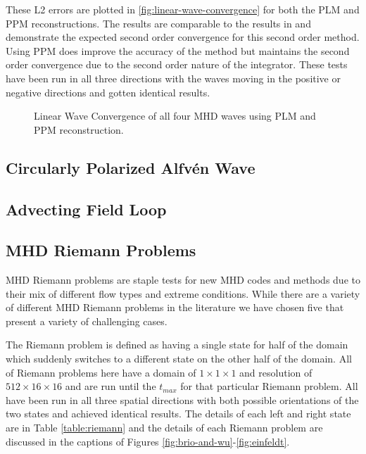 These L2 errors are plotted in \autoref{fig:linear-wave-convergence} for both the PLM and PPM reconstructions. The results are comparable to the results in \cite{stone_2009} and demonstrate the expected second order convergence for this second order method. Using PPM does improve the accuracy of the method but maintains the second order convergence due to the second order nature of the integrator. These tests have been run in all three directions with the waves moving in the positive or negative directions and gotten identical results.

\begin{figure}[ht!]
    \caption{Linear Wave Convergence of all four MHD waves using PLM and PPM reconstruction. }
    \label{fig:linear-wave-convergence}
\end{figure}

\subsection{Circularly Polarized Alfv\'en Wave}
\subsection{Advecting Field Loop}
\label{sec:afl}

\subsection{MHD Riemann Problems}
\label{sec:riemann}

MHD Riemann problems are staple tests for new MHD codes and methods due to their mix of different flow types and extreme conditions. While there are a variety of different MHD Riemann problems in the literature \citep{brio_wu_1988, einfeldt_1991, ryu_jones_1995, dai_woodward_1998} we have chosen five that present a variety of challenging cases. 

The Riemann problem is defined as having a single state for half of the domain which suddenly switches to a different state on the other half of the domain. All of Riemann problems here have a domain of $1\times1\times1$ and resolution of $512\times16\times16$ and are run until the $t_{max}$ for that particular Riemann problem. All have been run in all three spatial directions with both possible orientations of the two states and achieved identical results. The details of each left and right state are in Table \ref{table:riemann} and the details of each Riemann problem are discussed in the captions of Figures \ref{fig:brio-and-wu}-\ref{fig:einfeldt}.

